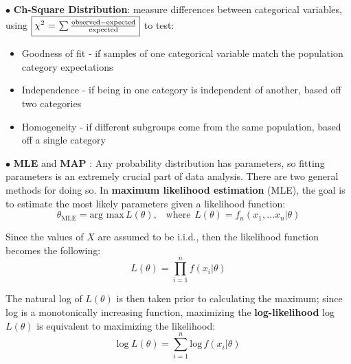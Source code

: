 \documentclass[letterpaper, 10.5pt,landscape]{article}
\begin{document}
\begin{multicols*}{3}
\vspace{2pt}
$\bullet$ \textbf{Ch-Square Distribution}:  measure differences between categorical variables, using $\boxed{\chi^2$ = $\sum \frac{\text{observed} - \text{expected}}{\text{expected}}}$ to test:
\begin{itemize}[label={--},leftmargin=4mm]
    \itemsep -.4mm
    \item Goodness of fit - if samples of one categorical variable match the population category expectations
    \item Independence -  if being in one category is independent of another, based off two categories
    \item Homogeneity - if different subgroups come from the same population, based off a single category
\end{itemize}









\vspace{2pt}
$\bullet$ \textbf{MLE} and \textbf{MAP} : 
Any probability distribution has parameters, so fitting parameters is an extremely crucial part of data analysis. There are two general methods for doing so. In \textbf{maximum likelihood estimation} (MLE), the goal is to estimate the most likely parameters given a likelihood function: 
\vspace{-3pt}
\[\boxed{\theta_{\text{MLE}} = \text{arg max} \hspace{2pt} L(\theta)}, \hspace{10pt} \text{where} \hspace{5pt} L(\theta) = f_{n}\left(x_{1}, \ldots x_{n} | \theta \right) \]

Since the values of $X$ are assumed to be i.i.d., then the likelihood function becomes the following:
\vspace{-3pt}
\[\boxed{L\left(\theta \right) = \prod^{n}_{i=1} f\left(x_{i}|\theta \right)} \]

The natural log of $L(\theta)$ is then taken prior to calculating the maximum; since log is a monotonically increasing function, maximizing the \textbf{log-likelihood} log $L(\theta)$ is equivalent to maximizing the likelihood:
\vspace{-3pt}
\[\boxed{\text{log} \hspace{3pt} L(\theta) = \sum^{n}_{i=1} \text{log} \hspace{2pt} f\left(x_{i}|\theta \right)}\]


\end{multicols*}
\end{document}
